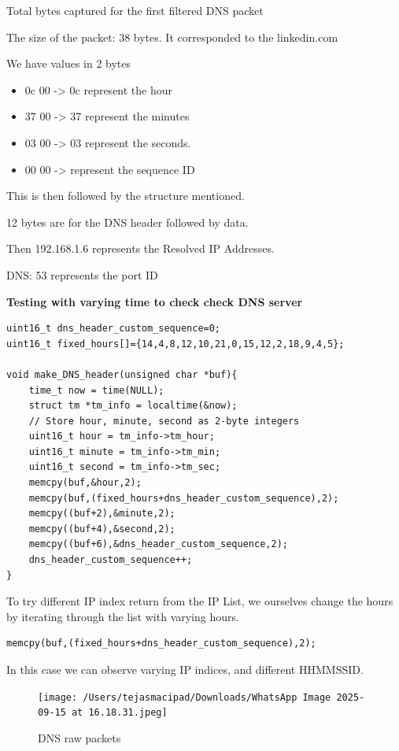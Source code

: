 \documentclass[12pt, a4paper]{report}
\begin{document}
Total bytes captured for the first filtered DNS packet

The size of the packet: 38 bytes.
It corresponded to the linkedin.com

We have values in 2 bytes
\begin{itemize}
    \item 0c 00 -> 0c represent the hour
    \item 37 00 -> 37 represent the minutes
    \item 03 00 -> 03 represent the seconds.
    \item 00 00 -> represent the sequence ID
\end{itemize}

This is then followed by the structure mentioned.

12 bytes are for the DNS header followed by data.

Then 192.168.1.6 represents the Resolved IP Addresses.

DNS: 53 represents the port ID

\newpage
\textbf{Testing with varying time to check check DNS server}

\begin{lstlisting}[caption={Testing}]
uint16_t dns_header_custom_sequence=0;
uint16_t fixed_hours[]={14,4,8,12,10,21,0,15,12,2,18,9,4,5};

void make_DNS_header(unsigned char *buf){
    time_t now = time(NULL);
    struct tm *tm_info = localtime(&now);
    // Store hour, minute, second as 2-byte integers
    uint16_t hour = tm_info->tm_hour;
    uint16_t minute = tm_info->tm_min;
    uint16_t second = tm_info->tm_sec;
    memcpy(buf,&hour,2);
    memcpy(buf,(fixed_hours+dns_header_custom_sequence),2);
    memcpy((buf+2),&minute,2);
    memcpy((buf+4),&second,2);
    memcpy((buf+6),&dns_header_custom_sequence,2);
    dns_header_custom_sequence++;
}
\end{lstlisting}

To try different IP index return from the IP List, we ourselves change the hours by iterating through the list with varying hours.

\begin{lstlisting}[caption={Testing}]
memcpy(buf,(fixed_hours+dns_header_custom_sequence),2);

\end{lstlisting}

In this case we can observe varying IP indices, and different HHMMSSID.

\begin{figure}[h!]
    \centering
    \texttt{[image: /Users/tejasmacipad/Downloads/WhatsApp Image 2025-09-15 at 16.18.31.jpeg]}
    \caption{DNS raw packets}
    \label{fig:your-label5}
\end{figure}
\end{document}
